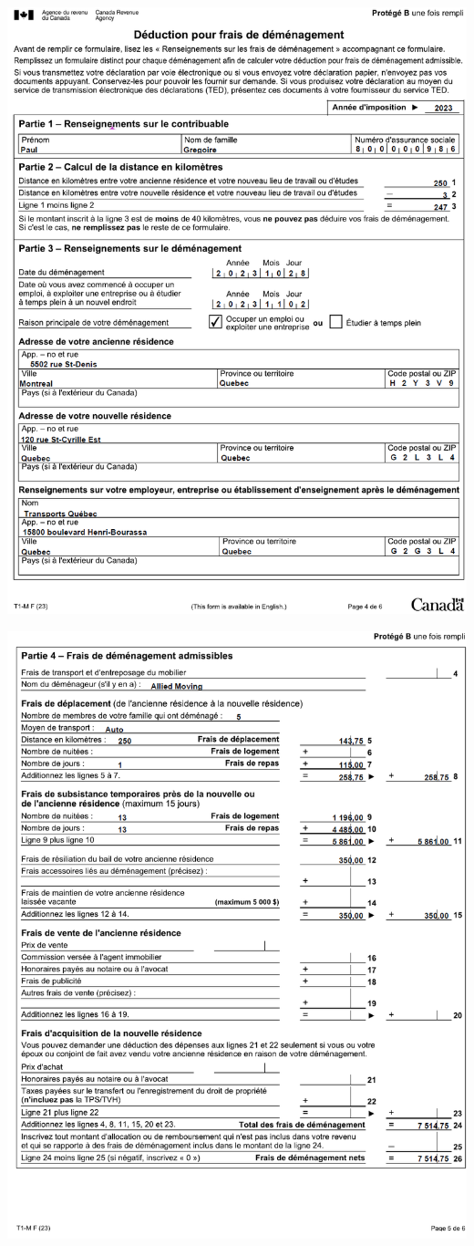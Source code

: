 \noindent
\includegraphics[height=\textheight]{exercice/3-5/Q5/T1-M-p4.png}

\noindent
\includegraphics[height=\textheight]{exercice/3-5/Q5/T1-M-p5.png}


